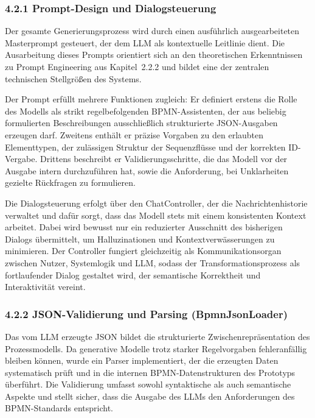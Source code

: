 \documentclass[a4paper,12pt]{scrreprt}
\begin{document}
\subsubsection*{4.2.1 Prompt-Design und Dialogsteuerung}

Der gesamte Generierungsprozess wird durch einen ausführlich ausgearbeiteten Masterprompt gesteuert, der dem LLM als kontextuelle Leitlinie dient. Die Ausarbeitung dieses Prompts orientiert sich an den theoretischen Erkenntnissen zu Prompt Engineering aus Kapitel~2.2.2 und bildet eine der zentralen technischen Stellgrößen des Systems.

Der Prompt erfüllt mehrere Funktionen zugleich:  
Er definiert erstens die Rolle des Modells als strikt regelbefolgenden BPMN-Assistenten, der aus beliebig formulierten Beschreibungen ausschließlich strukturierte JSON-Ausgaben erzeugen darf. Zweitens enthält er präzise Vorgaben zu den erlaubten Elementtypen, der zulässigen Struktur der Sequenzflüsse und der korrekten ID-Vergabe. Drittens beschreibt er Validierungsschritte, die das Modell vor der Ausgabe intern durchzuführen hat, sowie die Anforderung, bei Unklarheiten gezielte Rückfragen zu formulieren. 

Die Dialogsteuerung erfolgt über den ChatController, der die Nachrichtenhistorie verwaltet und dafür sorgt, dass das Modell stets mit einem konsistenten Kontext arbeitet. Dabei wird bewusst nur ein reduzierter Ausschnitt des bisherigen Dialogs übermittelt, um Halluzinationen und Kontextverwässerungen zu minimieren. Der Controller fungiert gleichzeitig als Kommunikationsorgan zwischen Nutzer, Systemlogik und LLM, sodass der Transformationsprozess als fortlaufender Dialog gestaltet wird, der semantische Korrektheit und Interaktivität vereint.

\subsubsection*{4.2.2 JSON-Validierung und Parsing (BpmnJsonLoader)}

Das vom LLM erzeugte JSON bildet die strukturierte Zwischenrepräsentation des Prozessmodells. Da generative Modelle trotz starker Regelvorgaben fehleranfällig bleiben können, wurde ein Parser implementiert, der die erzeugten Daten systematisch prüft und in die internen BPMN-Datenstrukturen des Prototyps überführt. Die Validierung umfasst sowohl syntaktische als auch semantische Aspekte und stellt sicher, dass die Ausgabe des LLMs den Anforderungen 
des BPMN-Standards entspricht.
\end{document}
